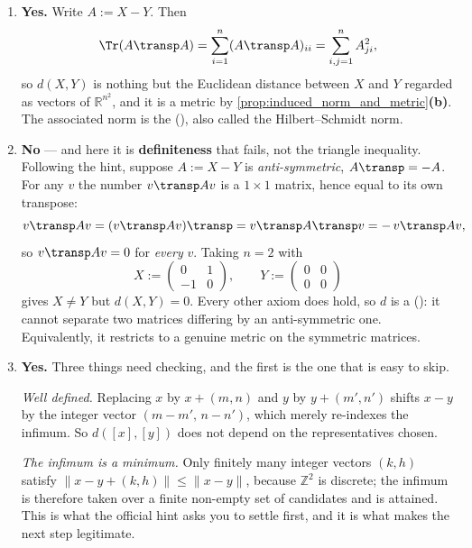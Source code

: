 \begin{exercisesolution}
\begin{enumerate}[label=\textbf{\arabic*.}]
    from \textbf{subadditivity of the square root}, $\sqrt{a+b} \leq \sqrt a + \sqrt b$ for
    $a,b \geq 0$, which holds because squaring the right-hand side gives
    $a+b+2\sqrt{ab} \geq a+b$. Hence
    \[|x_1-z_1|^{1/2} \leq \big(|x_1-y_1| + |y_1-z_1|\big)^{1/2}
      \leq |x_1-y_1|^{1/2} + |y_1-z_1|^{1/2}.\]
    Contrast this with part 3: $\sqrt{\cdot}$ is concave and vanishes at $0$, hence subadditive,
    while $(\cdot)^2$ is convex, hence super-additive. That single distinction settles both
    parts.
  \item \textbf{Yes.} Write $A := X-Y$. Then
    \[\Tr(A\transp A) = \sum_{i=1}^n (A\transp A)_{ii} = \sum_{i,j=1}^n A_{ji}^2,\]
    so $d(X,Y)$ is nothing but the Euclidean distance between $X$ and $Y$ regarded as vectors of
    $\mathbb{R}^{n^2}$, and it is a metric by
    \cref{prop:induced_norm_and_metric}\textbf{(b)}. The associated norm is the
     (), also called the Hilbert--Schmidt norm.
  \item \textbf{No} --- and here it is \textbf{definiteness} that fails, not the triangle
    inequality. Following the hint, suppose $A := X-Y$ is \emph{anti-symmetric},
    $A\transp = -A$. For any $v$ the number $v\transp Av$ is a $1\times1$ matrix, hence equal to
    its own transpose:
    \[v\transp A v = (v\transp A v)\transp = v\transp A\transp v = -\,v\transp A v,\]
    so $v\transp Av = 0$ for \emph{every} $v$. Taking $n=2$ with
    \[X := \begin{pmatrix} 0 & 1 \\ -1 & 0\end{pmatrix}, \qquad
      Y := \begin{pmatrix} 0 & 0 \\ 0 & 0\end{pmatrix}\]
    gives $X \neq Y$ but $d(X,Y) = 0$. Every other axiom does hold, so $d$ is a
     (): it cannot separate two matrices
    differing by an anti-symmetric one. Equivalently, it restricts to a genuine metric on the
    symmetric matrices.
  \item \textbf{Yes.} Three things need checking, and the first is the one that is easy to skip.

    \textit{Well defined.} Replacing $x$ by $x+(m,n)$ and $y$ by $y+(m',n')$ shifts $x-y$ by the
    integer vector $(m-m',\,n-n')$, which merely re-indexes the infimum. So $d([x],[y])$ does
    not depend on the representatives chosen.

    \textit{The infimum is a minimum.} Only finitely many integer vectors $(k,h)$ satisfy
    $\lVert x-y+(k,h)\rVert \leq \lVert x-y\rVert$, because $\mathbb{Z}^2$ is discrete; the
    infimum is therefore taken over a finite non-empty set of candidates and is attained. This
    is what the official hint asks you to settle first, and it is what makes the next step
    legitimate.


\end{enumerate}
\end{exercisesolution}
